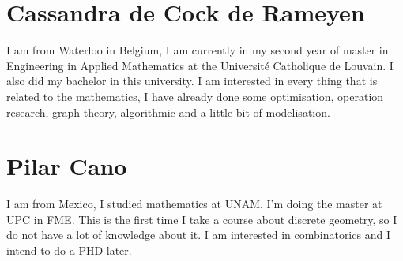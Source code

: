 \documentclass[11pt]{amsart}
\begin{document}
\section*{Cassandra de Cock de Rameyen}
I am from Waterloo in Belgium, I am currently in my second year of master in Engineering in Applied Mathematics at the Université Catholique de Louvain. I also did my bachelor in this university. I am interested in every thing that is related to the mathematics, I have already done some optimisation, operation research, graph theory, algorithmic and a little bit of modelisation.


\section*{Pilar Cano}
I am from Mexico, I studied mathematics at UNAM. I'm doing the master at UPC in FME. 
This is the first time I take a course about discrete geometry, so I do not have a lot of knowledge about it. 
I am interested in combinatorics and I intend to do a PHD later.
\end{document}
